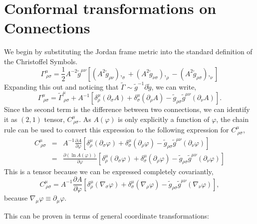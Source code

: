 \section{Conformal transformations on Connections}
We begin by substituting the Jordan frame metric into the standard definition of the Christoffel Symbols.
\begin{equation}
    \Gamma^{\mu}_{\ \rho\sigma} = \frac{1}{2}A^{-2}\tilde{g}^{\mu\nu}\left[(A^2\tilde{g}_{\rho\nu}),_{\sigma} + (A^2\tilde{g}_{\nu\sigma}),_{\rho}-(A^2\tilde{g}_{\rho\sigma}),_{\nu}\right]
\end{equation}
Expanding this out and noticing that $\tilde{\Gamma}\sim \tilde{g}^{-1}\partial \tilde{g}$, we can write,
\begin{equation}
    \Gamma^{\mu}_{\ \rho\sigma} = \tilde{\Gamma}^{\mu}_{\ \rho\sigma} + A^{-1}\left[\delta^{\mu}_{\rho}(\partial_{\sigma}A) + \delta^{\mu}_{\sigma}(\partial_{\rho}A) - \tilde{g}_{\rho\sigma}\tilde{g}^{\mu\nu}(\partial_{\nu}A)\right].
\end{equation}
Since the second term is the difference between two connections, we can identify it as $(2,1)$ tensor, $C^{\mu}_{\ \rho\sigma}$. As $A(\varphi)$ is only explicitly a function of $\varphi$, the chain rule can be used to convert this expression to the following expression for $C^{\mu}_{\ \rho\sigma}$,
\begin{eqnarray}
    C^{\mu}_{\ \rho\sigma} &=& A^{-1}\frac{\partial A}{\partial\varphi}\left[\delta^{\mu}_{\rho}(\partial_{\sigma}\varphi) + \delta^{\mu}_{\sigma}(\partial_{\rho}\varphi) - \tilde{g}_{\rho\sigma}\tilde{g}^{\mu\nu}(\partial_{\nu}\varphi)\right]\nonumber\\
    &=& \frac{\partial (\ln A(\varphi))}{\partial\varphi}\left[\delta^{\mu}_{\rho}(\partial_{\sigma}\varphi) + \delta^{\mu}_{\sigma}(\partial_{\rho}\varphi) - \tilde{g}_{\rho\sigma}\tilde{g}^{\mu\nu}(\partial_{\nu}\varphi)\right]
\end{eqnarray}
This is a tensor because we can be expressed completely covariantly,
\begin{equation}
C^{\mu}_{\ \rho\sigma} = A^{-1}\frac{\partial A}{\partial\varphi}\left[\delta^{\mu}_{\rho}(\nabla_{\sigma}\varphi) + \delta^{\mu}_{\sigma}(\nabla_{\rho}\varphi) - \tilde{g}_{\rho\sigma}\tilde{g}^{\mu\nu}(\nabla_{\nu}\varphi)\right],
\end{equation}
because $\nabla_{\mu}\varphi \equiv \partial_{\mu}\varphi$.

This can be proven in terms of general coordinate transformations: 

